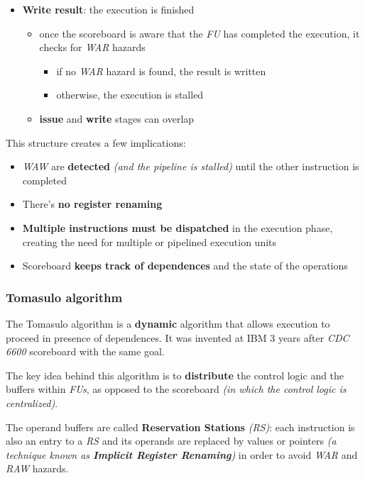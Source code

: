 \documentclass[english]{article}
\begin{document}
\begin{itemize}
  \item \textbf{Write result}: the execution is finished
        \begin{itemize}
          \item once the scoreboard is aware that the \textit{FU} has completed the execution, it checks for \textit{WAR} hazards
                \begin{itemize}
                  \item if no \textit{WAR} hazard is found, the result is written
                  \item otherwise, the execution is stalled
                \end{itemize}
          \item \textbf{issue} and \textbf{write} stages can overlap
        \end{itemize}
\end{itemize}

\bigskip
This structure creates a few implications:

\begin{itemize}
  \item \textit{WAW} are \textbf{detected} \textit{(and the pipeline is stalled)} until the other instruction is completed
  \item There's \textbf{no register renaming}
  \item \textbf{Multiple instructions must be dispatched} in the execution phase, creating the need for multiple or pipelined execution units
  \item Scoreboard \textbf{keeps track of dependences} and the state of the operations
\end{itemize}

\subsubsection{Tomasulo algorithm}

The Tomasulo algorithm is a \textbf{dynamic} algorithm that allows execution to proceed in presence of dependences.
It was invented at IBM \(3\) years after \textit{CDC 6600} scoreboard with the same goal.

The key idea behind this algorithm is to \textbf{distribute} the control logic and the buffers within \textit{FUs}, as opposed to the scoreboard \textit{(in which the control logic is centralized)}.

The operand buffers are called \textbf{Reservation Stations} \textit{(RS)}:
each instruction is also an entry to a \textit{RS} and its operands are replaced by values or pointers \textit{(a technique known as \textbf{Implicit Register Renaming})} in order to avoid \textit{WAR} and \textit{RAW} hazards.
\end{document}
